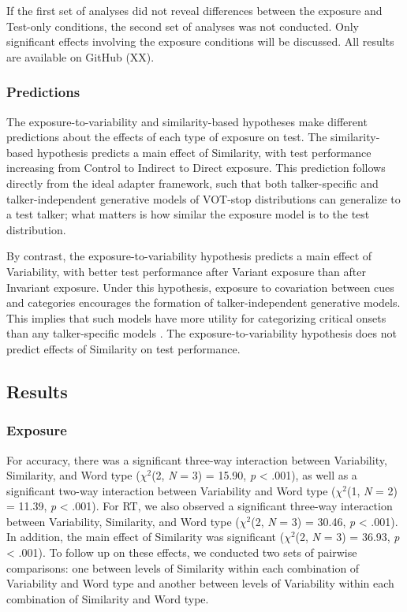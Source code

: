\documentclass[preprint, 3p, authoryear]{elsarticle} %
\begin{document}
If the first set of analyses did not reveal differences between the exposure and Test-only conditions, the second set of analyses was not conducted.
Only significant effects involving the exposure conditions will be discussed.
All results are available on GitHub (XX).

\hypertarget{predictions}{%
\subsubsection{Predictions}\label{predictions}}

The exposure-to-variability and similarity-based hypotheses make different predictions about the effects of each type of exposure on test.
The similarity-based hypothesis predicts a main effect of Similarity, with test performance increasing from Control to Indirect to Direct exposure.
This prediction follows directly from the ideal adapter framework, such that both talker-specific and talker-independent generative models of VOT-stop distributions can generalize to a test talker; what matters is how similar the exposure model is to the test distribution.

By contrast, the exposure-to-variability hypothesis predicts a main effect of Variability, with better test performance after Variant exposure than after Invariant exposure.
Under this hypothesis, exposure to covariation between cues and categories encourages the formation of talker-independent generative models.
This implies that such models have more utility for categorizing critical onsets than any talker-specific models \citep{kleinschmidt2019}.
The exposure-to-variability hypothesis does not predict effects of Similarity on test performance.

\hypertarget{results}{%
\subsection{Results}\label{results}}

\hypertarget{exposure}{%
\subsubsection{Exposure}\label{exposure}}

For accuracy, there was a significant three-way interaction between Variability, Similarity, and Word type (\(\chi^2\)(2, \emph{N} = 3) = 15.90, \emph{p} \textless{} .001), as well as a significant two-way interaction between Variability and Word type (\(\chi^2\)(1, \emph{N} = 2) = 11.39, \emph{p} \textless{} .001).
For RT, we also observed a significant three-way interaction between Variability, Similarity, and Word type (\(\chi^2\)(2, \emph{N} = 3) = 30.46, \emph{p} \textless{} .001).
In addition, the main effect of Similarity was significant (\(\chi^2\)(2, \emph{N} = 3) = 36.93, \emph{p} \textless{} .001).
To follow up on these effects, we conducted two sets of pairwise comparisons: one between levels of Similarity within each combination of Variability and Word type and another between levels of Variability within each combination of Similarity and Word type.
\end{document}
